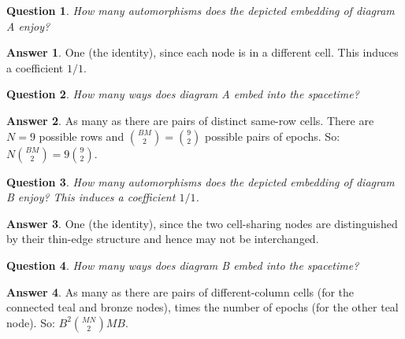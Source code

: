 \documentclass{article}
\theoremstyle{plain}
\newtheorem*{quest*}{Question}
\theoremstyle{definition}
\newtheorem*{answ*}{Answer}
\begin{document}
            \begin{quest*}
                How many automorphisms does the depicted embedding of diagram A
                enjoy?
            \end{quest*}
            \begin{answ*}
                One (the identity), since each node is in a different cell.
                This induces a coefficient $1/1$.
            \end{answ*}
            \begin{quest*}
                How many ways does diagram A embed into the spacetime?
            \end{quest*}
            \begin{answ*}
                As many as there are pairs of distinct same-row cells.  There
                are $N=9$ possible rows and ${BM\choose 2} = {9\choose 2}$
                possible pairs of epochs.  So: $N{BM\choose 2} = 9 {9\choose
                2}$.
            \end{answ*}

            \begin{quest*}
                How many automorphisms does the depicted embedding of diagram B
                enjoy?
                This induces a coefficient $1/1$.
            \end{quest*}
            \begin{answ*}
                One (the identity), since the two cell-sharing nodes are
                distinguished by their thin-edge structure and hence may not be
                interchanged.
            \end{answ*}
            \begin{quest*}
                How many ways does diagram B embed into the spacetime?
            \end{quest*}
            \begin{answ*}
                As many as there are pairs of different-column cells 
                (for the connected teal and bronze nodes), times the number
                of epochs (for the other teal node).  
                So: $B^2{MN \choose 2}MB$.
            \end{answ*}
\end{document}
